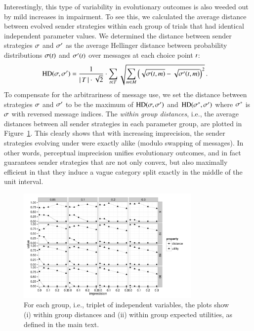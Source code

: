 \documentclass[fleqn,reqno,10pt]{article}
\newcommand{\rdd}{\acro{rdd}} %
\begin{document}
Interestingly, this type of variability in evolutionary outcomes is
also weeded out by mild increases in impairment. To see this, we
calculated the average distance between evolved sender strategies
within each group of trials that had identical independent
parameter values. We determined the distance between sender strategies
$\sigma$ and $\sigma'$ as the average Hellinger distance between
probability distributions $\sigma(t)$ and $\sigma'(t)$
over messages at each choice point $t$:
\begin{align*}
  \text{HD}(\sigma,\sigma') & = \frac{1}{{\left \lvert \, T \, \right\rvert \cdot
     \sqrt{2}}} \cdot  \sum_{t \in T} 
 \sqrt{\sum_{m \in  M}
         \left ( \sqrt{\sigma(t,m)} -
         \sqrt{\sigma'(t,m)} \right )^2 }\,.
\end{align*}
To compensate for the arbitrariness of message use, we set the
distance between strategies $\sigma$ and $\sigma'$ to be the maximum
of $\text{HD}(\sigma,\sigma')$ and $\text{HD}(\sigma^*,\sigma')$
where $\sigma^*$ is $\sigma$ with reversed message indices. The
\emph{within group distances}, i.e., the average distances between all
sender strategies in each parameter group, are plotted in
Figure~\ref{fig:AverageEUinGroups}. This clearly shows that with
increasing imprecision, the sender strategies evolving under \rdd were
exactly alike (modulo swapping of messages). In other words,
perceptual imprecision unifies evolutionary outcomes, and in fact
guarantees sender strategies that are not only convex, but also
maximally efficient in that they induce a vague category split exactly
in the middle of the unit interval.

\begin{figure}
  \centering

    \includegraphics[width=0.8\textwidth]{plots/WithinGroupMeasures.pdf}

    \caption{For each group, i.e., triplet of independent variables,
      the plots show (i) within group distances and (ii) within group
      expected utilities, as defined in the main text.}
  \label{fig:AverageEUinGroups}
\end{figure}
\end{document}
